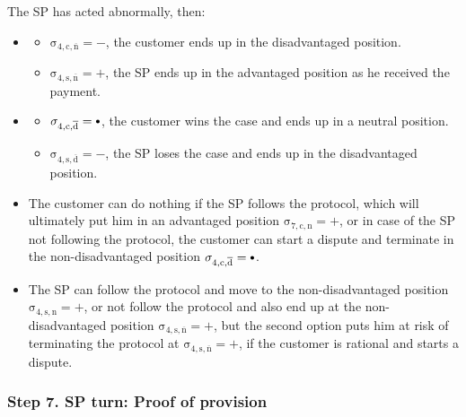 \documentclass{ieeeaccess}
\newcommand\neutral[1][.75]{\mathbin{\ThisStyle{\vcenter{\hbox{%
  \scalebox{#1}{$\SavedStyle\bullet$}}}}}%
}
\begin{document}
The SP has acted abnormally, then:

\begin{itemize}
\item \AgreeablePath
  \begin{itemize}
    \item \(\operatorname{\sigma_{4, c, \overline{n}} = -}\), the customer ends up in the disadvantaged position. 
    \item \(\operatorname{\sigma_{4, s, \overline{n}} = +}\), the SP ends up in the advantaged position as he received the payment. 
  \end{itemize}
\item \DisputePath
  \begin{itemize}
    \item \(\operatorname{\sigma_{4, c, \overline{d}} = \neutral}\), the customer wins the case and ends up in a neutral position. 
    \item \(\operatorname{\sigma_{4, s, \overline{d}} = -}\), the SP loses the case and ends up in the disadvantaged position. 
  \end{itemize}
\end{itemize}

\Fairness

\begin{itemize}
  \item The customer can do nothing if the SP follows the protocol, which will ultimately put him in an advantaged position \(\operatorname{\sigma_{7, c, n} = +}\), or in case of the SP not following the protocol, the customer can start a dispute and terminate in the non-disadvantaged position \(\operatorname{\sigma_{4, c, \overline{d}} = \neutral}\).
  \item The SP can follow the protocol and move to the non-disadvantaged position \(\operatorname{\sigma_{4, s, n} = +}\), or not follow the protocol and also end up at the non-disadvantaged position \(\operatorname{\sigma_{4, s, \overline{n}} = +}\), but the second option puts him at risk of terminating the protocol at \(\operatorname{\sigma_{4, s, \overline{n}} = +}\), if the customer is rational and starts a dispute.
\end{itemize}

\subsubsection{Step 7. SP turn: Proof of provision}\label{step-7-publication-of-proof-of-provision}
\end{document}
